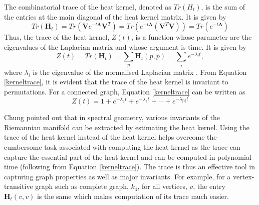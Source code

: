 \documentclass[10pt,a4paper]{article}
\theoremstyle{plain}
\theoremstyle{definition}
\begin{document}
        The combinatorial trace of the heat kernel, denoted as $Tr(H_t)$, is the sum of the entries at the main diagonal of the heat kernel matrix. 
        It is given by
        \begin{equation}
        Tr(\mathbf{H}_t) = Tr(\mathbf{V} e^{-t \mathbf{\Lambda}} \mathbf{V}^T)=Tr( e^{-t\mathbf{\Lambda}} (\mathbf{V}^T \mathbf{V})) = Tr(e^{- t\mathbf{\Lambda}})
        \end{equation}
        Thus, the trace of the heat kernel, $Z(t)$, is a function whose parameter are the eigenvalues of the Laplacian matrix and whose argument is time. It is given by                                                           
        \begin{equation}
        Z(t) = Tr(\mathbf{H}_t) = \sum_{p} \mathbf{H}_{t} (p,p)=  \sum_{i} e^{-\lambda_i t},
        \label{kerneltrace}
        \end{equation}
        where $\lambda_i$ is the eigenvalue of the normalised Laplacian matrix \citep{xiao2009graph}. 
        From Equation \ref{kerneltrace}, it is evident that the trace of the heat kernel is invariant to permutations.
        For a connected graph, Equation \ref{kerneltrace} can be written as 
        \begin{equation}
        Z(t) =  1+ e^{-\lambda_2 t} + e^{-\lambda_3t} + \cdots + e^{-\lambda_{|V|} t}
        \label{alttraceformula}
        \end{equation}
        
        Chung \citep{chung1997spectral} pointed out that in spectral geometry, various invariants of the Riemannian manifold can be extracted by estimating the heat kernel. Using the trace of the heat kernel instead of the heat kernel helps overcome the cumbersome task associated with computing the heat kernel as the trace can capture the essential part of the heat kernel and can  be computed in polynomial time (following from Equation \ref{kerneltrace}). The trace is thus an effective tool in capturing graph properties as well as  major invariants. For example, for a vertex-transitive graph such as complete graph, $k_4$, for all vertices, $v$, the entry $\mathbf{H}_{t} (v,v)$ is the same which makes computation of its trace much easier.
        
\end{document}
